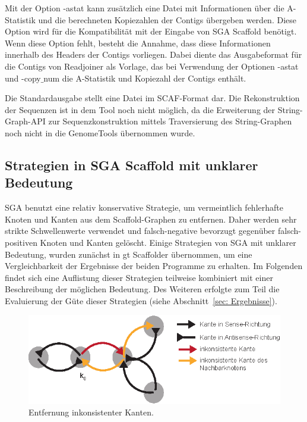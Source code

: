 \documentclass[a4paper,11pt,parskip,abstract=on]{scrartcl}
\begin{document}
Mit der Option -astat kann zusätzlich eine Datei mit Informationen
über die A-Statistik und die berechneten Kopiezahlen der Contigs
übergeben werden. Diese Option wird für die Kompatibilität mit der
Eingabe von SGA Scaffold benötigt. Wenn diese Option fehlt, besteht die
Annahme, dass diese Informationen innerhalb des Headers der
Contigs vorliegen. Dabei diente das Ausgabeformat für die Contigs von
Readjoiner als Vorlage, das bei Verwendung der Optionen -astat und
-copy$\_$num die A-Statistik und Kopiezahl der Contigs enthält.

Die Standardausgabe stellt eine Datei im SCAF-Format dar. Die
Rekonstruktion der Sequenzen ist in dem Tool noch nicht möglich, da
die Erweiterung der String-Graph-API zur Sequenzkonstruktion mittels
Traversierung des String-Graphen noch nicht in die GenomeTools
übernommen wurde.

\subsection{Strategien in SGA Scaffold mit unklarer Bedeutung}
\label{sec: wunderlich}
SGA benutzt eine relativ konservative Strategie, um vermeintlich
fehlerhafte Knoten und Kanten aus dem Scaffold-Graphen zu
entfernen. Daher werden sehr strikte Schwellenwerte verwendet und
falsch-negative bevorzugt gegenüber falsch-positiven Knoten und Kanten
gelöscht. Einige Strategien von SGA mit unklarer Bedeutung, wurden
zunächst in gt Scaffolder übernommen, um eine Vergleichbarkeit der
Ergebnisse der beiden Programme zu erhalten. Im Folgenden findet sich
eine Auflistung dieser Strategien teilweise kombiniert mit einer
Beschreibung der möglichen Bedeutung. Des Weiteren erfolgte zum Teil
die Evaluierung der Güte dieser Strategien
(siehe Abschnitt~\ref{sec: Ergebnisse}).

\begin{figure}
  \centering
  \includegraphics[width=0.6\linewidth]{inkonsistenteKante.eps}
  \caption{Entfernung inkonsistenter Kanten.}
\label{abb: inkonsistenteKante}
\end{figure}
\end{document}
